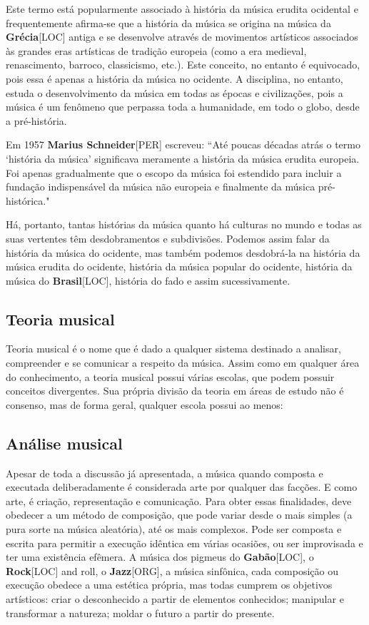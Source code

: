 \documentclass[a4paper,12pt]{article}
\begin{document}
Este termo está popularmente associado à história da música erudita ocidental e frequentemente afirma-se que a história da música se origina na música da \textbf{Grécia}\textsc{[LOC]} antiga e se desenvolve através de movimentos artísticos associados às grandes eras artísticas de tradição europeia (como a era medieval, renascimento, barroco, classicismo, etc.). Este conceito, no entanto é equivocado, pois essa é apenas a história da música no ocidente. A disciplina, no entanto, estuda o desenvolvimento da música em todas as épocas e civilizações, pois a música é um fenômeno que perpassa toda a humanidade, em todo o globo, desde a pré-história.

Em 1957 \textbf{Marius Schneider}\textsc{[PER]} escreveu: ``Até poucas décadas atrás o termo `história da música' significava meramente a história da música erudita europeia. Foi apenas gradualmente que o escopo da música foi estendido para incluir a fundação indispensável da música não europeia e finalmente da música pré-histórica."

Há, portanto, tantas histórias da música quanto há culturas no mundo e todas as suas vertentes têm desdobramentos e subdivisões. Podemos assim falar da história da música do ocidente, mas também podemos desdobrá-la na história da música erudita do ocidente, história da música popular do ocidente, história da música do \textbf{Brasil}\textsc{[LOC]}, história do fado e assim sucessivamente.

\subsection*{Teoria musical}
Teoria musical é o nome que é dado a qualquer sistema destinado a analisar, compreender e se comunicar a respeito da música. Assim como em qualquer área do conhecimento, a teoria musical possui várias escolas, que podem possuir conceitos divergentes. Sua própria divisão da teoria em áreas de estudo não é consenso, mas de forma geral, qualquer escola possui ao menos:

\subsection*{Análise musical}
Apesar de toda a discussão já apresentada, a música quando composta e executada deliberadamente é considerada arte por qualquer das facções. E como arte, é criação, representação e comunicação. Para obter essas finalidades, deve obedecer a um método de composição, que pode variar desde o mais simples (a pura sorte na música aleatória), até os mais complexos. Pode ser composta e escrita para permitir a execução idêntica em várias ocasiões, ou ser improvisada e ter uma existência efêmera. A música dos pigmeus do \textbf{Gabão}\textsc{[LOC]}, o \textbf{Rock}\textsc{[LOC]} and roll, o \textbf{Jazz}\textsc{[ORG]}, a música sinfônica, cada composição ou execução obedece a uma estética própria, mas todas cumprem os objetivos artísticos: criar o desconhecido a partir de elementos conhecidos; manipular e transformar a natureza; moldar o futuro a partir do presente.
\end{document}
